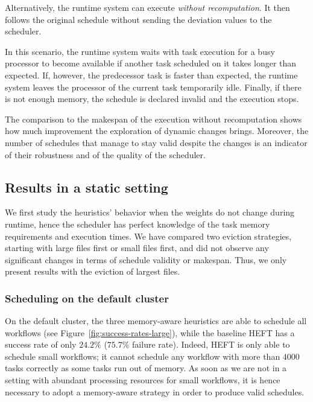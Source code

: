 \documentclass[conference]{IEEEtran}
\newcommand{\algo}[1]{\textsc{#1}}
\newcommand{\heft}{\algo{HEFT}\xspace}
\newcommand{\new}[1]{{#1}}
\begin{document}
\new{Alternatively, the runtime system can execute \textit{without recomputation}.
It then follows the original schedule without sending the deviation values to the scheduler.

In this scenario, the runtime system waits with task execution for a busy processor to become available if another task scheduled on it takes longer than expected.
If, however, the predecessor task is faster than expected, the runtime system leaves the processor of the current task temporarily idle.
Finally, if there is not enough memory, the schedule is declared invalid and the execution stops.

The comparison to the makespan of the execution without recomputation shows how much improvement the exploration of dynamic
changes brings.
Moreover, the number of schedules that manage to stay valid despite the changes is an indicator of their robustness and of the quality of the scheduler.}

\subsection{Results in a static setting}
\label{sec.expe.static}
%
We first study the heuristics' behavior when the weights do not change during runtime,
hence the scheduler has perfect knowledge of the task memory requirements and execution times.
We have compared two eviction strategies, starting with large files first or small files first,
and did not observe any significant changes in terms of schedule validity or makespan.
Thus, we only present results with the eviction of largest files. %



\medskip
\subsubsection{Scheduling on the default cluster}
%
%
On the default cluster,  the three memory-aware heuristics are able to schedule all workflows
(see Figure~\ref{fig:success-rates-large}), while
the baseline \heft has a success rate of only $24.2\%$ ($75.7\%$ failure rate).
Indeed, \heft is only able to schedule small workflows; it cannot schedule any workflow 
with more than $4000$ tasks correctly as some tasks run out of memory. As soon as we are not in a setting
with abundant processing resources for small workflows, it is hence necessary to adopt
a memory-aware strategy in order to produce valid schedules.
\end{document}
